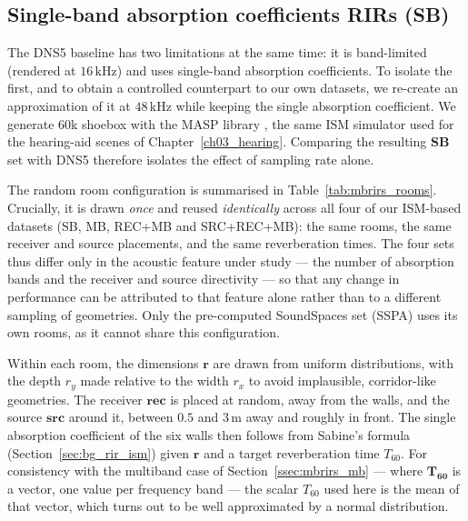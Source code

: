\subsection{Single-band absorption coefficients RIRs (SB)}
\label{ssec:mbrirs_sb}

The \acrshort{DNS}5 baseline has two limitations at the same time: it is
band-limited (rendered at $16\,\text{kHz}$) and uses single-band absorption coefficients. To
isolate the first, and to obtain a controlled counterpart to our own datasets,
we re-create an approximation of it at $48\,\text{kHz}$ while keeping the single
absorption coefficient. We generate $60$k shoebox  with the
\acrshort{MASP} library \citep{perez2020parametric, politis2016microphone}, the
same \acrshort{ISM} simulator used for the hearing-aid scenes of
Chapter~\ref{ch03_hearing}. Comparing the resulting \textbf{SB} set with
\acrshort{DNS}5 therefore isolates the effect of sampling rate alone.

The random room configuration is summarised in Table~\ref{tab:mbrirs_rooms}.
Crucially, it is drawn \emph{once} and reused \emph{identically} across all
four of our \acrshort{ISM}-based datasets (SB, MB, REC+MB and SRC+REC+MB): the
same rooms, the same receiver and source placements, and the same reverberation
times. The four sets thus differ only in the acoustic feature under study ---
the number of absorption bands and the receiver and source directivity --- so
that any change in performance can be attributed to that feature alone rather
than to a different sampling of geometries. Only the pre-computed SoundSpaces
set (SSPA) uses its own rooms, as it cannot share this configuration.

Within each room, the dimensions $\boldsymbol{r}$ are drawn from uniform
distributions, with the depth $r_y$ made relative to the width $r_x$ to avoid
implausible, corridor-like geometries. The receiver $\boldsymbol{rec}$ is placed
at random, away from the walls, and the source $\boldsymbol{src}$ around it,
between $0.5$ and $3\,\text{m}$ away and roughly in front. The single absorption
coefficient of the six walls then follows from Sabine's formula
(Section~\ref{sec:bg_rir_ism}) given $\boldsymbol{r}$ and a target reverberation
time $T_{60}$. For consistency with the multiband case of
Section~\ref{ssec:mbrirs_mb} --- where $\boldsymbol{T_{60}}$ is a vector, one
value per frequency band --- the scalar $T_{60}$ used here is the mean of that
vector, which turns out to be well approximated by a normal distribution.



